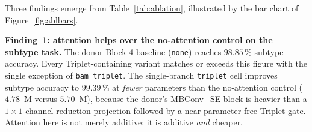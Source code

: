 \begin{table}[!t]
\caption{AttentionHub-v1 ablation on the Custom EfficientNet~V2 backbone, under
the matched baseline recipe. Cells are sorted by ascending binary accuracy.
BAM is a mixed spatial-and-channel module, Triplet a cross-dimensional spatial
module, and KAN a purely channel-wise module. Role abbreviations: sp = spatial,
ch = channel, cd-sp = cross-dimensional spatial; $\cup$ denotes the union of
roles the active branches collectively exercise.}
\label{tab:ablation}
\centering
\setlength{\tabcolsep}{3.5pt}
\end{table}

Three findings emerge from Table~\ref{tab:ablation}, illustrated by the bar
chart of Figure~\ref{fig:ablbars}.

\textbf{Finding~1: attention helps over the no-attention control on the
subtype task.} The donor Block-4 baseline (\texttt{none}) reaches $98.85\,\%$
subtype accuracy. Every Triplet-containing variant matches or exceeds this
figure with the single exception of \texttt{bam\_triplet}. The single-branch
\texttt{triplet} cell improves subtype accuracy to $99.39\,\%$ at \emph{fewer}
parameters than the no-attention control ($4.78$~M versus $5.70$~M), because
the donor's MBConv+SE block is heavier than a $1\times1$ channel-reduction
projection followed by a near-parameter-free Triplet gate. Attention here is
not merely additive; it is additive \emph{and} cheaper.

